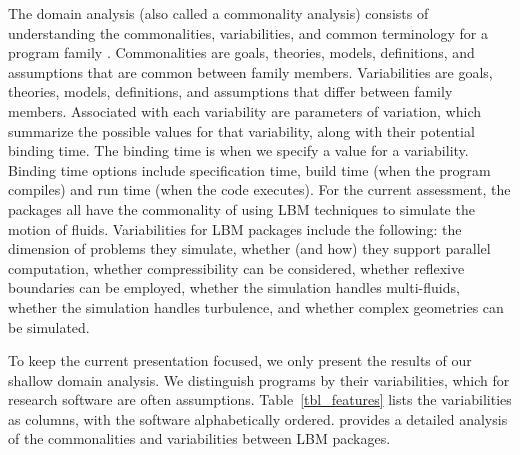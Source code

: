 \documentclass[final, 3p, times, authoryear]{elsarticle}
\begin{document}
The domain analysis (also called a commonality analysis) consists of
understanding the commonalities, variabilities, and common terminology for a
program family \citep{weiss1997defining}. Commonalities are goals, theories,
models, definitions, and assumptions that are common between family members.
Variabilities are goals, theories, models, definitions, and assumptions that
differ between family members. Associated with each variability are parameters
of variation, which summarize the possible values for that variability, along
with their potential binding time. The binding time is when we specify a value
for a variability. Binding time options include specification time, build time
(when the program compiles) and run time (when the code executes). For the
current assessment, the packages all have the commonality of using LBM
techniques to simulate the motion of fluids. Variabilities for LBM packages
include the following: the dimension of problems they simulate, whether (and
how) they support parallel computation, whether compressibility can be
considered, whether reflexive boundaries can be employed, whether the simulation
handles multi-fluids, whether the simulation handles turbulence, and whether
complex geometries can be simulated. 

To keep the current presentation focused, we only present the results of our
shallow domain analysis. We distinguish programs by their variabilities, which
for research software are often assumptions. Table~\ref{tbl_features} lists the
variabilities as columns, with the software alphabetically ordered.
\citet{Michalski2021} provides a detailed analysis of the commonalities and
variabilities between LBM packages.
\end{document}
